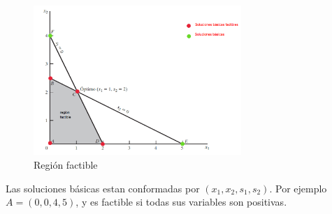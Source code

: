 \documentclass[../main.tex]{subfiles}
\begin{document}
\begin{example}
            \begin{figure}[h]
                \centering
                \includegraphics[width=0.7\textwidth]{../images/variable_basicas.png}
                \caption{Región factible}
                \label{fig:region_factible}
            \end{figure}

            Las soluciones básicas estan conformadas por $(x_1, x_2, s_1, s_2)$. Por ejemplo $A=(0,0,4,5)$, y es factible si todas sus variables son positivas.
        \end{example}
        
\end{document}

